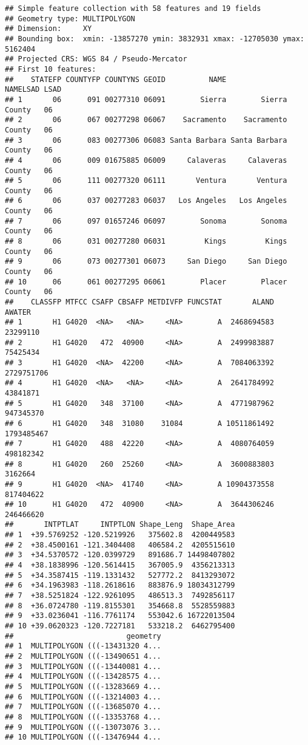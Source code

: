 \documentclass[
]{article}
\begin{document}
\begin{verbatim}
## Simple feature collection with 58 features and 19 fields
## Geometry type: MULTIPOLYGON
## Dimension:     XY
## Bounding box:  xmin: -13857270 ymin: 3832931 xmax: -12705030 ymax: 5162404
## Projected CRS: WGS 84 / Pseudo-Mercator
## First 10 features:
##    STATEFP COUNTYFP COUNTYNS GEOID          NAME             NAMELSAD LSAD
## 1       06      091 00277310 06091        Sierra        Sierra County   06
## 2       06      067 00277298 06067    Sacramento    Sacramento County   06
## 3       06      083 00277306 06083 Santa Barbara Santa Barbara County   06
## 4       06      009 01675885 06009     Calaveras     Calaveras County   06
## 5       06      111 00277320 06111       Ventura       Ventura County   06
## 6       06      037 00277283 06037   Los Angeles   Los Angeles County   06
## 7       06      097 01657246 06097        Sonoma        Sonoma County   06
## 8       06      031 00277280 06031         Kings         Kings County   06
## 9       06      073 00277301 06073     San Diego     San Diego County   06
## 10      06      061 00277295 06061        Placer        Placer County   06
##    CLASSFP MTFCC CSAFP CBSAFP METDIVFP FUNCSTAT       ALAND     AWATER
## 1       H1 G4020  <NA>   <NA>     <NA>        A  2468694583   23299110
## 2       H1 G4020   472  40900     <NA>        A  2499983887   75425434
## 3       H1 G4020  <NA>  42200     <NA>        A  7084063392 2729751706
## 4       H1 G4020  <NA>   <NA>     <NA>        A  2641784992   43841871
## 5       H1 G4020   348  37100     <NA>        A  4771987962  947345370
## 6       H1 G4020   348  31080    31084        A 10511861492 1793485467
## 7       H1 G4020   488  42220     <NA>        A  4080764059  498182342
## 8       H1 G4020   260  25260     <NA>        A  3600883803    3162664
## 9       H1 G4020  <NA>  41740     <NA>        A 10904373558  817404622
## 10      H1 G4020   472  40900     <NA>        A  3644306246  246466620
##       INTPTLAT     INTPTLON Shape_Leng  Shape_Area
## 1  +39.5769252 -120.5219926   375602.8  4200449583
## 2  +38.4500161 -121.3404408   406584.2  4205515610
## 3  +34.5370572 -120.0399729   891686.7 14498407802
## 4  +38.1838996 -120.5614415   367005.9  4356213313
## 5  +34.3587415 -119.1331432   527772.2  8413293072
## 6  +34.1963983 -118.2618616   883876.9 18034312799
## 7  +38.5251824 -122.9261095   486513.3  7492856117
## 8  +36.0724780 -119.8155301   354668.8  5528559883
## 9  +33.0236041 -116.7761174   553042.6 16722013504
## 10 +39.0620323 -120.7227181   533218.2  6462795400
##                          geometry
## 1  MULTIPOLYGON (((-13431320 4...
## 2  MULTIPOLYGON (((-13490651 4...
## 3  MULTIPOLYGON (((-13440081 4...
## 4  MULTIPOLYGON (((-13428575 4...
## 5  MULTIPOLYGON (((-13283669 4...
## 6  MULTIPOLYGON (((-13214003 4...
## 7  MULTIPOLYGON (((-13685070 4...
## 8  MULTIPOLYGON (((-13353768 4...
## 9  MULTIPOLYGON (((-13073076 3...
## 10 MULTIPOLYGON (((-13476944 4...
\end{verbatim}
\end{document}
